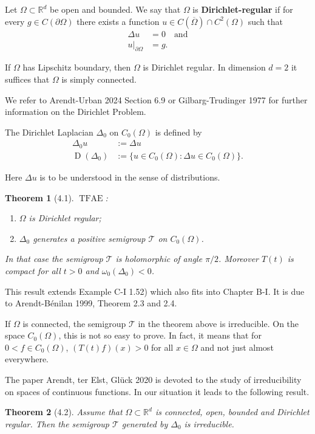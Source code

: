 \documentclass[11pt]{article}
\newtheorem{theorem}{Theorem}[section]
\DeclareMathOperator{\dom}{D}
\DeclareMathOperator{\TFAE}{TFAE}
\begin{document}
Let $\Omega \subset \mathbb{R}^d$ be open and bounded. We say that $\Omega$ is \textbf{Dirichlet-regular} if for every $g \in C(\partial\Omega)$ there exists a function $u \in C(\overline{\Omega}) \cap C^2(\Omega)$ such that
\begin{align}
\Delta u &= 0 \quad \text{and}\\
u|_{\partial\Omega} &= g.
\end{align}

If $\Omega$ has Lipschitz boundary, then $\Omega$ is Dirichlet regular. In dimension $d = 2$ it suffices that $\Omega$ is simply connected.

We refer to Arendt-Urban 2024 Section 6.9 or Gilbarg-Trudinger 1977 for further information on the Dirichlet Problem.

The Dirichlet Laplacian $\Delta_0$ on $C_0(\Omega)$ is defined by
\begin{align}
\Delta_0 u &:= \Delta u\\
\dom(\Delta_0) &:= \{u \in C_0(\Omega) : \Delta u \in C_0(\Omega)\}.
\end{align}

Here $\Delta u$ is to be understood in the sense of distributions.

\begin{theorem}[4.1]
$\TFAE$:
\begin{enumerate}
\item[(a)] $\Omega$ is Dirichlet regular;
\item[(b)] $\Delta_0$ generates a positive semigroup $\mathcal{T}$ on $C_0(\Omega)$.
\end{enumerate}
In that case the semigroup $\mathcal{T}$ is holomorphic of angle $\pi/2$. Moreover $T(t)$ is compact for all $t > 0$ and $\omega_0(\Delta_0) < 0$.
\end{theorem}

This result extends Example C-I 1.52) which also fits into Chapter B-I. It is due to Arendt-Bénilan 1999, Theorem 2.3 and 2.4.

If $\Omega$ is connected, the semigroup $\mathcal{T}$ in the theorem above is irreducible. On the space $C_0(\Omega)$, this is not so easy to prove. In fact, it means that for $0 < f \in C_0(\Omega)$, $(T(t)f)(x) > 0$ for all $x \in \Omega$ and not just almost everywhere.

The paper Arendt, ter Elst, Glück 2020 is devoted to the study of irreducibility on spaces of continuous functions. In our situation it leads to the following result.

\begin{theorem}[4.2]
Assume that $\Omega \subset \mathbb{R}^d$ is connected, open, bounded and Dirichlet regular. Then the semigroup $\mathcal{T}$ generated by $\Delta_0$ is irreducible.
\end{theorem}
\end{document}
